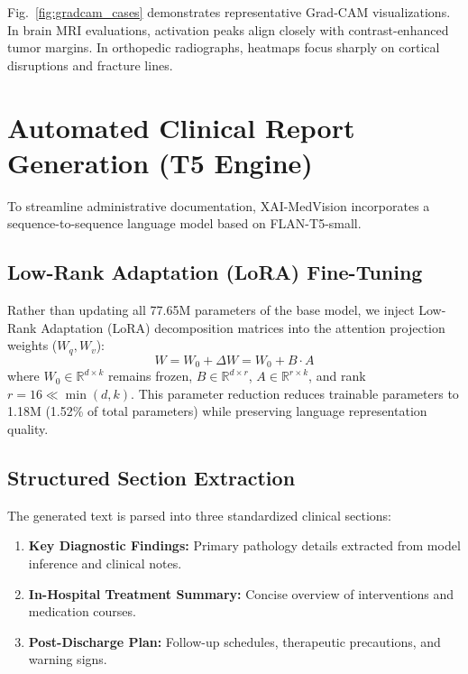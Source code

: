 \documentclass[conference]{IEEEtran}
\begin{document}
Fig.~\ref{fig:gradcam_cases} demonstrates representative Grad-CAM visualizations. In brain MRI evaluations, activation peaks align closely with contrast-enhanced tumor margins. In orthopedic radiographs, heatmaps focus sharply on cortical disruptions and fracture lines.

\section{Automated Clinical Report Generation (T5 Engine)}
To streamline administrative documentation, XAI-MedVision incorporates a sequence-to-sequence language model based on FLAN-T5-small.

\subsection{Low-Rank Adaptation (LoRA) Fine-Tuning}
Rather than updating all 77.65M parameters of the base model, we inject Low-Rank Adaptation (LoRA) decomposition matrices into the attention projection weights ($W_q, W_v$):
\begin{equation}
W = W_0 + \Delta W = W_0 + B \cdot A
\end{equation}
where $W_0 \in \mathbb{R}^{d \times k}$ remains frozen, $B \in \mathbb{R}^{d \times r}$, $A \in \mathbb{R}^{r \times k}$, and rank $r = 16 \ll \min(d, k)$. This parameter reduction reduces trainable parameters to 1.18M (1.52\% of total parameters) while preserving language representation quality.

\subsection{Structured Section Extraction}
The generated text is parsed into three standardized clinical sections:
\begin{enumerate}
    \item \textbf{Key Diagnostic Findings:} Primary pathology details extracted from model inference and clinical notes.
    \item \textbf{In-Hospital Treatment Summary:} Concise overview of interventions and medication courses.
    \item \textbf{Post-Discharge Plan:} Follow-up schedules, therapeutic precautions, and warning signs.
\end{enumerate}
\end{document}
